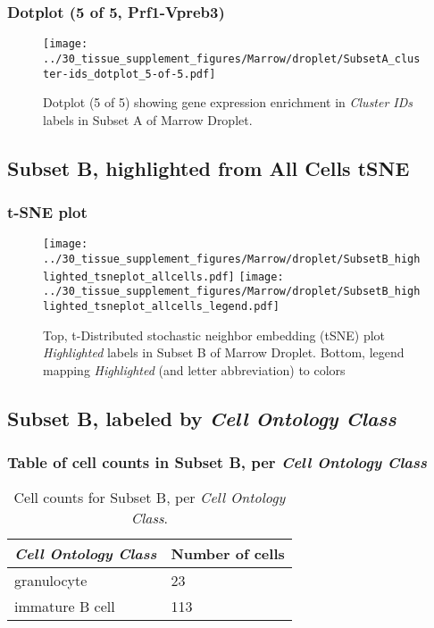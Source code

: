\clearpage

\subsubsection{Dotplot (5 of 5, Prf1-Vpreb3)}
\begin{figure}[h]
\centering
\texttt{[image: ../30\_tissue\_supplement\_figures/Marrow/droplet/SubsetA\_cluster-ids\_dotplot\_5-of-5.pdf]}

\caption{ Dotplot (5 of 5)  showing gene expression enrichment in \emph{Cluster IDs} labels in Subset A of Marrow Droplet. }
\end{figure}


\clearpage
\subsection{Subset B, highlighted from All Cells tSNE}
\subsubsection{t-SNE plot}
\begin{figure}[h]
\centering
\texttt{[image: ../30\_tissue\_supplement\_figures/Marrow/droplet/SubsetB\_highlighted\_tsneplot\_allcells.pdf]}
\texttt{[image: ../30\_tissue\_supplement\_figures/Marrow/droplet/SubsetB\_highlighted\_tsneplot\_allcells\_legend.pdf]}
\caption{Top, t-Distributed stochastic neighbor embedding (tSNE) plot  \emph{Highlighted} labels in Subset B of Marrow Droplet. Bottom, legend mapping \emph{Highlighted} (and letter abbreviation) to colors}
\end{figure}


\clearpage

\subsection{Subset B, labeled by \emph{Cell Ontology Class}}
\subsubsection{Table of cell counts in Subset B, per \emph{Cell Ontology Class}}\begin{table}[h]
\centering
\label{my-label}
\begin{tabular}{@{}ll@{}}
\toprule

\emph{Cell Ontology Class}& Number of cells \\ \midrule
granulocyte & 23 \\

immature B cell & 113 \\
\bottomrule
\end{tabular}
\caption{Cell counts for Subset B, per \emph{Cell Ontology Class}.}
\end{table}


